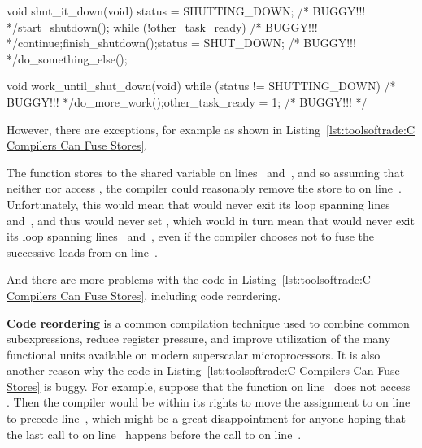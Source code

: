 \begin{listing}[tbp]
\begin{fcvlabel}
\begin{VerbatimL}[commandchars=\\\[\]]
void shut_it_down(void)
{
	status = SHUTTING_DOWN; /* BUGGY!!! */\lnlbl[store:a]
	start_shutdown();
	while (!other_task_ready) /* BUGGY!!! */\lnlbl[loop:b]
		continue;\lnlbl[loop:e]
	finish_shutdown();\lnlbl[finish]
	status = SHUT_DOWN; /* BUGGY!!! */\lnlbl[store:b]
	do_something_else();
}

void work_until_shut_down(void)
{
	while (status != SHUTTING_DOWN) /* BUGGY!!! */
		do_more_work();
	other_task_ready = 1; /* BUGGY!!! */
}
\end{VerbatimL}
\end{fcvlabel}
\caption{C Compilers Can Fuse Stores}
\label{lst:toolsoftrade:C Compilers Can Fuse Stores}
\end{listing}

However, there are exceptions, for example as shown in
Listing~\ref{lst:toolsoftrade:C Compilers Can Fuse Stores}.
\begin{fcvref}
The function  stores to the shared
variable  on lines~ and~,
and so assuming that neither
 nor  access ,
the compiler could reasonably remove the store to  on
line~.
Unfortunately, this would mean that  would
never exit its loop spanning
lines~ and~, and thus would never set
, which would in turn mean that 
would never exit its loop spanning
lines~ and~, even if
the compiler chooses not to fuse the successive loads from
 on line~.

And there are more problems with the code in
Listing~\ref{lst:toolsoftrade:C Compilers Can Fuse Stores},
including code reordering.

{\bf Code reordering} is a common compilation technique used to
combine common subexpressions, reduce register pressure, and
improve utilization of the many functional units available on
modern superscalar microprocessors.
It is also another reason why the code in
Listing~\ref{lst:toolsoftrade:C Compilers Can Fuse Stores}
is buggy.
For example, suppose that the  function on
line~
does not access .
Then the compiler would be within its rights to move the assignment
to  on
line~ to precede line~, which might
be a great disappointment for anyone hoping that the last call to
 on line~ happens before the call to
 on line~.
\end{fcvref}

